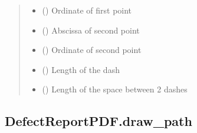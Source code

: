 \documentclass[letterpaper,10pt,english]{sphinxmanual}
\begin{document}
\begin{fulllineitems}
\begin{fulllineitems}
\begin{quote}
\begin{description}
\begin{itemize}
\item {} 
\sphinxAtStartPar
{} () \textendash{} Ordinate of first point

\item {} 
\sphinxAtStartPar
{} () \textendash{} Abscissa of second point

\item {} 
\sphinxAtStartPar
{} () \textendash{} Ordinate of second point

\item {} 
\sphinxAtStartPar
{} () \textendash{} Length of the dash

\item {} 
\sphinxAtStartPar
{} () \textendash{} Length of the space between 2 dashes

\end{itemize}

\end{description}\end{quote}

\end{fulllineitems}



\subsection{DefectReportPDF.draw\_path}
\label{\detokenize{generated/quality_assessment.quality_pdf_report.DefectReportPDF.draw_path:defectreportpdf-draw-path}}\label{\detokenize{generated/quality_assessment.quality_pdf_report.DefectReportPDF.draw_path::doc}}


\end{fulllineitems}
\end{document}
